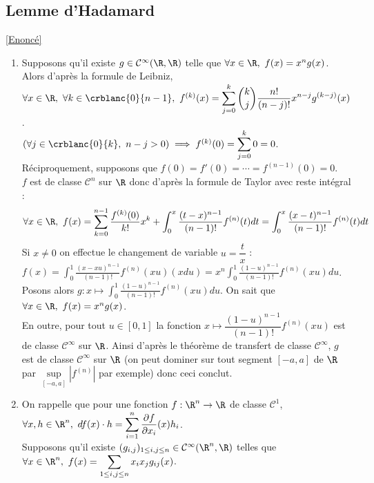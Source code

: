 \documentclass{book}
\begin{document}
	\subsection{Lemme d'Hadamard }
	\label{Lemme d'Hadamard corrigé}
	\textcolor{blue}{\hyperref[Lemme d'Hadamard]{[Enoncé]}}\\
	\begin{enumerate}
		\item Supposons qu'il existe $g\in \mathcal C^\infty(\R,\R)$ telle que $\forall x\in \R,\ f(x)=x^ng(x)$.\\
		Alors d'après la formule de Leibniz, $\forall x\in \R,\ \forall k\in \crblanc{0}{n-1},\ f^{(k)}(x)=\displaystyle\sum_{j=0}^k\binom{k}{j}\frac{n!}{(n-j)!}x^{n-j}g^{(k-j)}(x)$.\\
		$(\forall j\in \crblanc{0}{k},\ n-j>0)\implies f^{(k)}(0)=\displaystyle\sum_{j=0}^k0=0$.\\
		Réciproquement, supposons que $f(0)=f'(0)=\cdots=f^{(n-1)}(0)=0$.\\
		$f$ est de classe $\mathcal C^n$ sur $\R$ donc d'après la formule de Taylor avec reste intégral :
		$$\forall x\in \R,\ f(x)=\displaystyle\sum_{k=0}^{n-1}\dfrac{f^{(k)}(0)}{k!}x^k+\int_0^x\frac{(t-x)^{n-1}}{(n-1)!}f^{(n)}(t)dt=\int_0^x\frac{(x-t)^{n-1}}{(n-1)!}f^{(n)}(t)dt$$
		Si $x\ne 0$ on effectue le changement de variable $u=\dfrac{t}{x}$ :\\
		$f(x)=\displaystyle\int_0^1\frac{(x-xu)^{n-1}}{(n-1)!}f^{(n)}(xu)(xdu)=x^n\int_0^1\frac{(1-u)^{n-1}}{(n-1)!}f^{(n)}(xu)du$.\\
		Posons alors $g:x\mapsto \displaystyle\int_0^1\frac{(1-u)^{n-1}}{(n-1)!}f^{(n)}(xu)du$. On sait que $\forall x\in \R,\ f(x)=x^ng(x)$.\\
		En outre, pour tout $u\in [0,1]$ la fonction $x\mapsto \dfrac{(1-u)^{n-1}}{(n-1)!}f^{(n)}(xu)$ est de classe $\mathcal C^\infty$ sur $\R$. Ainsi d'après le théorème de transfert de classe $\mathcal C^\infty$, $g$ est de classe $\mathcal C^\infty$ sur $\R$ (on peut dominer sur tout segment $[-a,a]$ de $\R$ par $\sup\limits_{[-a,a]}|f^{(n)}|$ par exemple) donc ceci conclut.
		\item On rappelle que pour une fonction $f:\R^n\to \R$ de classe $\mathcal C^1$, $\forall x,h\in \R^n,\ df(x)\cdot h=\displaystyle\sum_{i=1}^n\frac{\partial f}{\partial x_i}(x)h_i$.\\
		Supposons qu'il existe $(g_{i,j})_{1\leq i,j\leq n}\in \mathcal C^\infty(\R^n,\R)$ telles que $\forall x\in \R^n,\ f(x)=\displaystyle\sum_{1\leq i,j\leq n}x_ix_jg_{ij}(x)$.\\

\end{enumerate}
\end{document}
